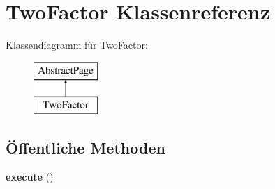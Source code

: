 \hypertarget{class_two_factor}{}\section{Two\+Factor Klassenreferenz}
\label{class_two_factor}
Klassendiagramm für Two\+Factor\+:\begin{figure}[H]
\begin{center}
\leavevmode
\includegraphics[height=2.000000cm]{class_two_factor}
\end{center}
\end{figure}
\subsection*{Öffentliche Methoden}
\begin{DoxyCompactItemize}
\item 
\mbox{\label{class_two_factor_ad21868eff06107f4d22fe22aaf34bb01}} 
{\bfseries execute} ()
\end{DoxyCompactItemize}
